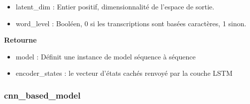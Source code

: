 \begin{enumerate}
\begin{itemize}
                \item latent\_dim : Entier positif, dimensionnalité de l'espace de sortie.
                \item word\_level : Booléen, 0 si les transcriptions sont basées caractères, 1 sinon.
            \end{itemize}
            \textbf{Retourne} 
            \begin{itemize}
                \item model : Définit une instance de model séquence à séquence 
                \item encoder\_states : le vecteur d'états cachés renvoyé par la couche LSTM
            \end{itemize}
    \end{enumerate}

    \subsubsection{cnn\_based\_model}
